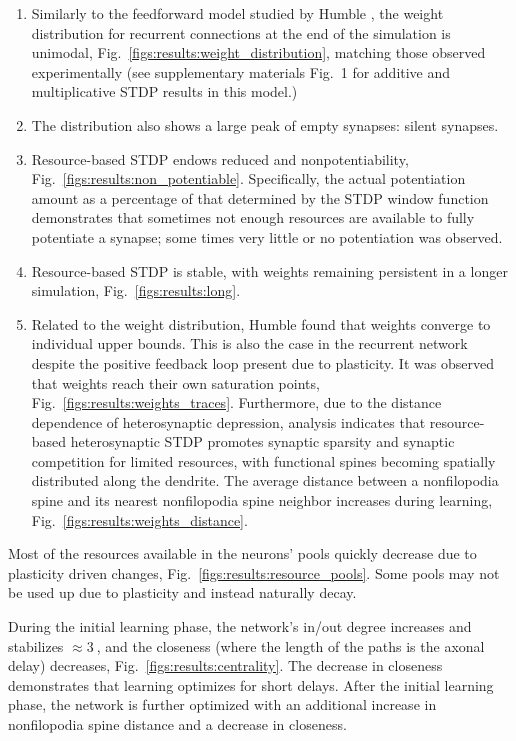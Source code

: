 \documentclass[utf8]{FrontiersinHarvard} %
\begin{document}
\begin{enumerate}
    \item Similarly to the feedforward model studied by Humble \citeyearpar{Humble.2013}, the weight distribution for recurrent connections at the end of the simulation is unimodal, Fig.~\ref{figs:results:weight_distribution}, matching those observed experimentally (see supplementary materials Fig.~1 for additive and multiplicative STDP results in this model.)

    \item The distribution also shows a large peak of empty synapses: silent synapses.

    \item Resource-based STDP endows reduced and nonpotentiability, Fig.~\ref{figs:results:non_potentiable}. Specifically, the actual potentiation amount as a percentage of that determined by the STDP window function demonstrates that sometimes not enough resources are available to fully potentiate a synapse; some times very little or no potentiation was observed.

    \item Resource-based STDP is stable, with weights remaining persistent in a longer simulation, Fig.~\ref{figs:results:long}.

    \item Related to the weight distribution, Humble \citeyearpar{Humble.2013} found that weights converge to individual upper bounds. This is also the case in the recurrent network despite the positive feedback loop present due to plasticity. It was observed that weights reach their own saturation points, Fig.~\ref{figs:results:weights_traces}. Furthermore, due to the distance dependence of heterosynaptic depression, analysis indicates that resource-based heterosynaptic STDP promotes synaptic sparsity and synaptic competition for limited resources, with functional spines becoming spatially distributed along the dendrite. The average distance between a nonfilopodia spine and its nearest nonfilopodia spine neighbor increases during learning, Fig.~\ref{figs:results:weights_distance}.
\end{enumerate}

Most of the resources available in the neurons' pools quickly decrease due to plasticity driven changes, Fig.~\ref{figs:results:resource_pools}. Some pools may not be used up due to plasticity and instead naturally decay.

During the initial learning phase, the network's in/out degree increases and stabilizes $\approx\SI{3}{}$, and the closeness (where the length of the paths is the axonal delay) decreases, Fig.~\ref{figs:results:centrality}. The decrease in closeness demonstrates that learning optimizes for short delays. After the initial learning phase, the network is further optimized with an additional increase in nonfilopodia spine distance and a decrease in closeness.
\end{document}
